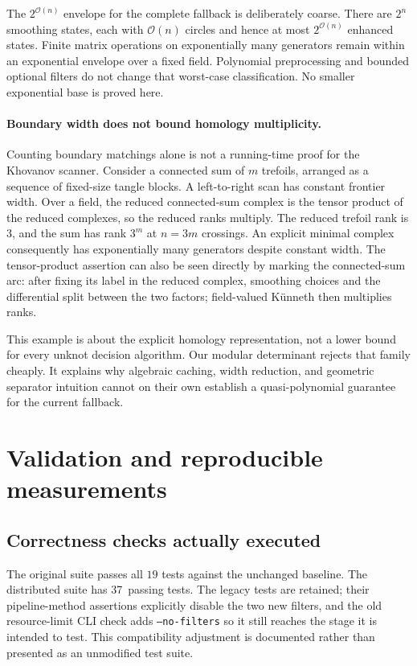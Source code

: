\documentclass[11pt]{article}
\theoremstyle{remark}\newtheorem{remark}[theorem]{Remark}
\newcommand{\OO}{\mathcal O}
\newcommand{\code}[1]{\texttt{\small #1}}
\newcommand{\TestCount}{37}
\begin{document}
The $2^{\OO(n)}$ envelope for the complete fallback is deliberately coarse.
There are $2^n$ smoothing states, each with $\OO(n)$ circles and hence at
most $2^{\OO(n)}$ enhanced states. Finite matrix operations on exponentially
many generators remain within an exponential envelope over a fixed field.
Polynomial preprocessing and bounded optional filters do not change that
worst-case classification. No smaller exponential base is proved here.

\paragraph{Boundary width does not bound homology multiplicity.}
Counting boundary matchings alone is not a running-time proof for the
Khovanov scanner. Consider a connected sum of $m$ trefoils, arranged as a
sequence of fixed-size tangle blocks. A left-to-right scan has constant
frontier width. Over a field, the reduced connected-sum complex is the
tensor product of the reduced complexes, so the reduced ranks multiply.
The reduced trefoil rank is $3$, and the sum has rank $3^m$ at $n=3m$
crossings. An explicit minimal complex consequently has exponentially
many generators despite constant width. The tensor-product assertion can
also be seen directly by marking the connected-sum arc: after fixing its
label in the reduced complex, smoothing choices and the differential split
between the two factors; field-valued K\"unneth then multiplies ranks.

This example is about the explicit homology representation, not a lower
bound for every unknot decision algorithm. Our modular determinant rejects
that family cheaply. It explains why algebraic caching, width reduction,
and geometric separator intuition cannot on their own establish a
quasi-polynomial guarantee for the current fallback.

\section{Validation and reproducible measurements}
\label{sec:validation}

\subsection{Correctness checks actually executed}

The original suite passes all $19$ tests against the unchanged baseline.
The distributed suite has \TestCount\ passing tests. The legacy tests are
retained; their pipeline-method assertions explicitly disable the two new
filters, and the old resource-limit CLI check adds \code{--no-filters} so
it still reaches the stage it is intended to test. This compatibility
adjustment is documented rather than presented as an unmodified test suite.
\end{document}
